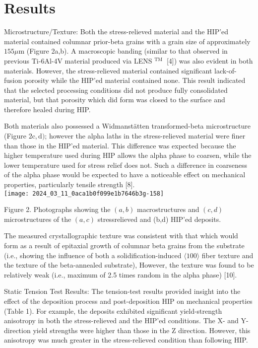\documentclass[10pt]{article}
\begin{document}
\section*{Results}
Microstructure/Texture: Both the stress-relieved material and the HIP'ed material contained columnar prior-beta grains with a grain size of approximately $155 \mu \mathrm{m}$ (Figure 2a,b). A macroscopic banding (similar to that observed in previous Ti-6Al-4V material produced via LENS $^{\text {TM }}$ [4]) was also evident in both materials. However, the stress-relieved material contained significant lack-of-fusion porosity while the HIP'ed material contained none. This result indicated that the selected processing conditions did not produce fully consolidated material, but that porosity which did form was closed to the surface and therefore healed during HIP.

Both materials also possessed a Widmanstätten transformed-beta microstructure (Figure $2 \mathrm{c}, \mathrm{d})$; however the alpha laths in the stress-relieved material were finer than those in the HIP'ed material. This difference was expected because the higher temperature used during HIP allows the alpha phase to coarsen, while the lower temperature used for stress relief does not. Such a difference in coarseness of the alpha phase would be expected to have a noticeable effect on mechanical properties, particularly tensile strength [8].\\
\texttt{[image: 2024\_03\_11\_0aca1b0f099e1b7646b3g-158]}

Figure 2. Photographs showing the $(a, b)$ macrostructures and $(c, d)$ microstructures of the $(a, c)$ stressrelieved and (b,d) HIP'ed deposits.

The measured crystallographic texture was consistent with that which would form as a result of epitaxial growth of columnar beta grains from the substrate (i.e., showing the influence of both a solidification-induced $\langle 100\rangle$ fiber texture and the texture of the beta-annealed substrate), However, the texture was found to be relatively weak (i.e., maximum of 2.5 times random in the alpha phase) [10].

Static Tension Test Results: The tension-test results provided insight into the effect of the deposition process and post-deposition HIP on mechanical properties (Table 1). For example, the deposits exhibited significant yield-strength anisotropy in both the stress-relieved and the HIP'ed conditions. The X- and Y-direction yield strengths were higher than those in the $\mathrm{Z}$ direction. However, this anisotropy was much greater in the stress-relieved condition than following HIP.
\end{document}
